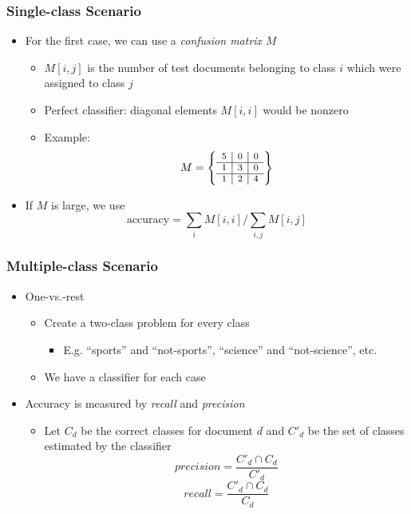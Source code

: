 \documentclass{beamer}
\begin{document}
\begin{frame} \frametitle{Single-class Scenario}
  \begin{itemize}
  \item For the first case, we can use a \emph{confusion matrix} $M$
    \begin{itemize}
    \item $M[i,j]$ is the number of test documents belonging to class $i$ which
      were assigned to class $j$
    \item Perfect classifier: diagonal elements $M[i,i]$ would be nonzero
    \item Example:
      \begin{displaymath}
        \footnotesize
        M = \left\{
          \begin{array}{c|c|c}
            5 & 0 & 0 \\\hline
            1 & 3 & 0 \\\hline
            1 & 2 & 4
          \end{array}
        \right\}
      \end{displaymath}
    \end{itemize}
  \item If $M$ is large, we use
    \begin{displaymath}
      \text{accuracy} = \sum_i M[i,i] / \sum_{i,j} M[i,j]
    \end{displaymath}
  \end{itemize}
\end{frame}


\begin{frame} \frametitle{Multiple-class Scenario}
  
  \begin{itemize}
  \item One-vs.-rest
    \begin{itemize}
    \item Create a two-class problem for every class
      \begin{itemize}
      \item E.g. ``sports'' and ``not-sports'', ``science'' and
        ``not-science'', etc.
      \end{itemize}
    \item We have a classifier for each case
    \end{itemize}
  \item Accuracy is measured by \emph{recall} and \emph{precision}
    \begin{itemize}
    \item Let $C_d$ be the correct classes for document $d$ and $C'_d$ be the
      set of classes estimated by the classifier
      \begin{displaymath}
        precision = \frac{C'_d \cap C_d}{C'_d}
      \end{displaymath}
      \begin{displaymath}
        recall = \frac{C'_d \cap C_d}{C_d}
      \end{displaymath}
    \end{itemize}
  \end{itemize}
\end{frame}
\end{document}
